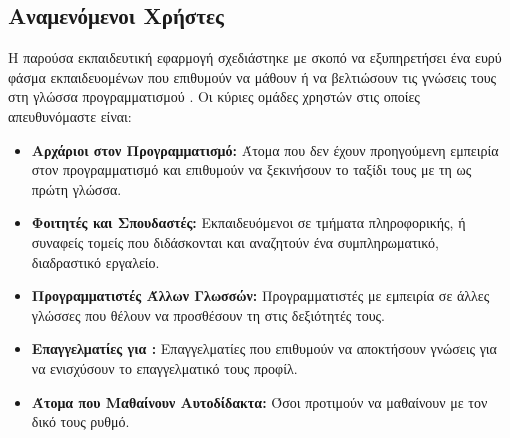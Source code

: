 \subsection{Αναμενόμενοι Χρήστες}
\label{sec:anamenomenoi_xristes}
Η παρούσα εκπαιδευτική εφαρμογή σχεδιάστηκε με σκοπό να εξυπηρετήσει ένα ευρύ φάσμα εκπαιδευομένων που επιθυμούν να μάθουν ή να βελτιώσουν τις γνώσεις τους στη γλώσσα προγραμματισμού . Οι κύριες ομάδες χρηστών στις οποίες απευθυνόμαστε είναι:
\begin{itemize}[leftmargin=*, noitemsep]
    \item \textbf{Αρχάριοι στον Προγραμματισμό:} Άτομα που δεν έχουν προηγούμενη εμπειρία στον προγραμματισμό και επιθυμούν να ξεκινήσουν το ταξίδι τους με τη  ως πρώτη γλώσσα.
    \item \textbf{Φοιτητές και Σπουδαστές:} Εκπαιδευόμενοι σε τμήματα πληροφορικής,  ή συναφείς τομείς που διδάσκονται  και αναζητούν ένα συμπληρωματικό, διαδραστικό εργαλείο.
    \item \textbf{Προγραμματιστές Άλλων Γλωσσών:} Προγραμματιστές με εμπειρία σε άλλες γλώσσες που θέλουν να προσθέσουν τη  στις δεξιότητές τους.
    \item \textbf{Επαγγελματίες για :} Επαγγελματίες που επιθυμούν να αποκτήσουν γνώσεις  για να ενισχύσουν το επαγγελματικό τους προφίλ.
    \item \textbf{Άτομα που Μαθαίνουν Αυτοδίδακτα:} Όσοι προτιμούν να μαθαίνουν με τον δικό τους ρυθμό.
\end{itemize}